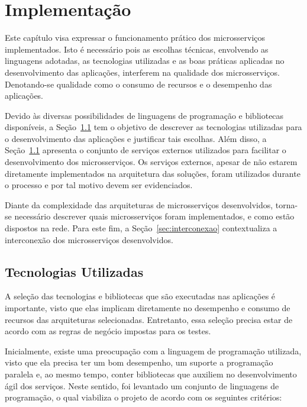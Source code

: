 \chapter{Implementação}
\label{cap5}



Este capítulo visa expressar o funcionamento prático dos microsserviços implementados.
%
Isto é necessário pois as escolhas técnicas, envolvendo as linguagens adotadas, as tecnologias utilizadas e as boas práticas aplicadas no desenvolvimento das aplicações, interferem na qualidade dos microsserviços.
%
Denotando-se qualidade como o consumo de recursos e o desempenho das aplicações.





Devido às diversas possibilidades de linguagens de programação e bibliotecas disponíveis, a Seção~\ref{sec:tecnologias} tem o objetivo de descrever as tecnologias utilizadas para o desenvolvimento das aplicações e justificar tais escolhas.
%
Além disso, a Seção~\ref{sec:tecnologias} apresenta o conjunto de serviços externos utilizados para facilitar o desenvolvimento dos microsserviços.
%
Os serviços externos, apesar de não estarem diretamente implementados na arquitetura das soluções, foram utilizados durante o processo e por tal motivo devem ser evidenciados.



Diante da complexidade das arquiteturas de microsserviços desenvolvidos, torna-se necessário descrever quais microsserviços foram implementados, e como estão dispostos na rede.
%
Para este fim, a Seção~\ref{sec:interconexao} contextualiza a interconexão dos microsserviços desenvolvidos.



\section{Tecnologias Utilizadas}
\label{sec:tecnologias}



A seleção das tecnologias e bibliotecas que são executadas nas aplicações é importante, visto que elas implicam diretamente no desempenho e consumo de recursos das arquiteturas selecionadas.
%
Entretanto, essa seleção precisa estar de acordo com as regras de negócio impostas para os testes.



Inicialmente, existe uma preocupação com a linguagem de programação utilizada, visto que ela precisa ter um bom desempenho, um suporte a programação paralela e, ao mesmo tempo, conter bibliotecas que auxiliem no desenvolvimento ágil dos serviços.
%
Neste sentido, foi levantado um conjunto de linguagens de programação, o qual viabiliza o projeto de acordo com os seguintes critérios:



